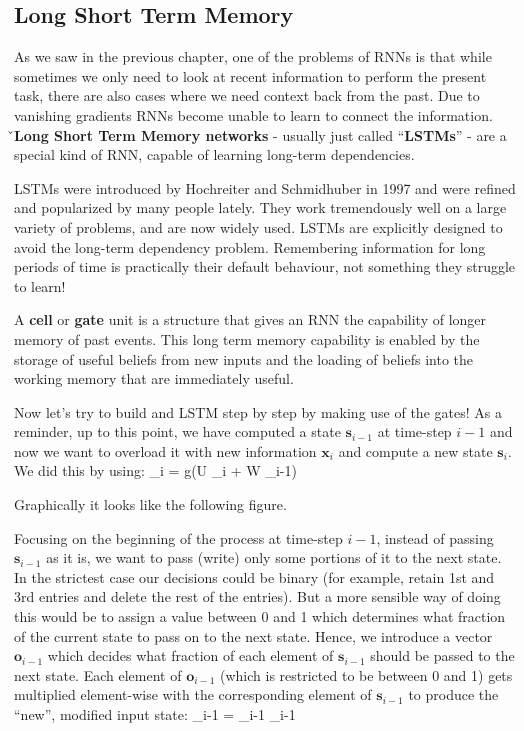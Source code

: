 \subsection{Long Short Term Memory}

As we saw in the previous chapter, one of the problems of RNNs is that while sometimes we only need to look at recent
information to perform the present task, there are also cases where we need context back from the past. Due to
vanishing gradients RNNs become unable to learn to connect the information. \v

\textbf{Long Short Term Memory networks} - usually just called ``\textbf{LSTMs}'' - are a special kind of RNN,
capable of learning long-term dependencies.
\ed

LSTMs were introduced by Hochreiter and Schmidhuber in 1997 and were refined and popularized by many people lately.
They work tremendously well on a large variety of problems, and are now widely used. LSTMs are explicitly designed to
avoid the long-term dependency problem. Remembering information for long periods of time is practically their default
behaviour, not something they struggle to learn!

A \textbf{cell} or \textbf{gate} unit is a structure that gives an RNN the capability of longer memory of past events.
This long term memory capability is enabled by the storage of useful beliefs from new inputs and the loading of
beliefs into the working memory that are immediately useful.
\ed

Now let's try to build and LSTM step by step by making use of the gates! As a reminder, up to this point, we have
computed a state $\boldsymbol{s}_{i-1}$ at time-step $i - 1$ and now we want to overload it with new information
$\boldsymbol{x}_{i}$ and compute a new state $\boldsymbol{s}_{i}$. We did this by using:
\bse
{}_{i} = g(U _{i} + W _{i-1})
\ese

Graphically it looks like the following figure.


Focusing on the beginning of the process at time-step $i-1$, instead of passing $\boldsymbol{s}_{i-1}$ as it is, we
want to pass (write) only some portions of it to the next state. In the strictest case our decisions could be binary
(for example, retain 1st and 3rd entries and delete the rest of the entries). But a more sensible way of doing this
would be to assign a value between 0 and 1 which determines what fraction of the current state to pass on to the next
state. Hence, we introduce a vector $\boldsymbol{o}_{i-1}$ which decides what fraction of each element of
$\boldsymbol{s}_{i-1}$ should be passed to the next state. Each element of $\boldsymbol{o}_{i-1}$ (which is
restricted to be between 0 and 1) gets multiplied element-wise with the corresponding element of
$\boldsymbol{s}_{i-1}$ to produce the ``new'', modified input state:
\bse
{}_{i-1} = _{i-1} \odot {}_{i-1}
\ese

